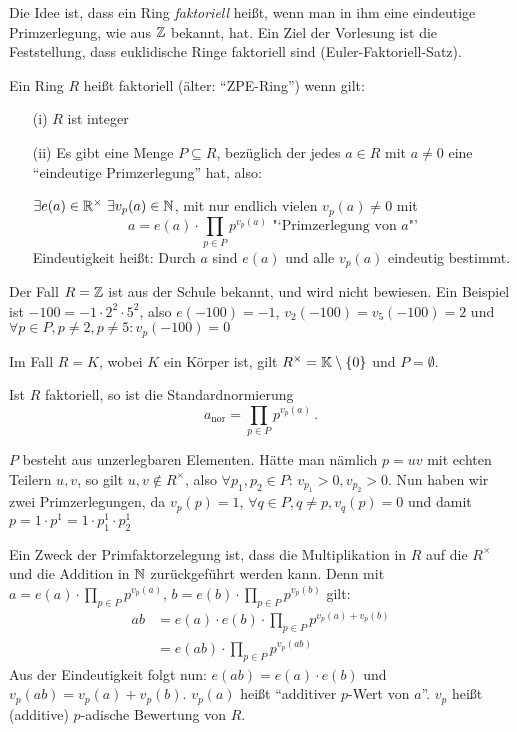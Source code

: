 \documentclass[a4paper,twoside,DIV15,BCOR12mm]{scrbook}
\begin{document}
Die Idee ist, dass ein Ring \emph{faktoriell} heißt, wenn man in ihm
eine eindeutige Primzerlegung, wie aus $\mathbb{Z}$ bekannt, hat. Ein Ziel
der Vorlesung ist die Feststellung, dass euklidische Ringe
faktoriell sind (Euler-Faktoriell-Satz).

\begin{definition}
Ein Ring $R$ heißt faktoriell (älter: "`ZPE-Ring"') wenn gilt:
\begin{itemize}
\item[(i)] $R$ ist integer
\item[(ii)] Es gibt eine Menge $P\subseteq R$, bezüglich der jedes $a\in R$ mit $a\ne 0$ eine "`eindeutige Primzerlegung"' hat, also:

$\exists e(a)\in\mathbb{R}^\times \ \exists v_p(a) \in \mathbb{N}$, mit nur
endlich vielen $v_p(a)\ne 0$ mit
\[a = e(a) \cdot \prod_{p\in P} p^{v_p(a)} \text{ "`Primzerlegung von $a$"'}\]
Eindeutigkeit heißt: Durch $a$ sind $e(a)$ und alle $v_p(a)$
eindeutig bestimmt.
\end{itemize}
\end{definition}

Der Fall $R=\mathbb{Z}$ ist aus der Schule bekannt, und wird nicht
bewiesen. Ein Beispiel ist $-100 = -1 \cdot 2^2 \cdot 5^2$, also
$e(-100)=-1$, $v_2(-100)=v_5(-100)=2$ und $\forall p\in P, p\ne 2,
p\ne5: v_p(-100)=0$

Im Fall $R=K$, wobei $K$ ein Körper ist, gilt
$R^\times=\mathbb{K}\setminus\{0\}$ und $ P=\emptyset$.

Ist $R$ faktoriell, so ist die Standardnormierung \[a_\text{nor} =
\prod_{p\in P} p^{v_p(a)}\,.\]

\begin{bemerkung}
$P$ besteht aus unzerlegbaren Elementen. Hätte man nämlich $p=uv$
mit echten Teilern $u,v$, so gilt $u,v\notin R^\times$, also
$\forall p_1,p_2 \in P$: $v_{p_1}>0,v_{p_2}>0$. Nun haben wir zwei
Primzerlegungen, da $v_p(p) = 1$, $\forall q\in P, q\ne p, v_q(p)=0$
und damit $p=1 \cdot p^1 = 1\cdot p_1^1 \cdot p_2^1$
\end{bemerkung}

Ein Zweck der Primfaktorzelegung ist, dass die Multiplikation in $R$
auf die $R^\times$ und die Addition in $\mathbb{N}$ zurückgeführt werden
kann. Denn mit $a=e(a) \cdot \prod_{p\in P} p^{v_p(a)}$, $b=e(b)
\cdot \prod_{p\in P} p^{v_p(b)}$ gilt:
\begin{align*}
ab &= e(a) \cdot e(b) \cdot \prod_{p\in P} p^{v_p(a) + v_p(b)} \\
   &= e(ab)\cdot \prod_{p\in P} p^{v_p(ab)}
\end{align*}
Aus der Eindeutigkeit folgt nun: $e(ab) = e(a) \cdot e(b)$ und
$v_p(ab) = v_p(a)+ v_p(b)$. $v_p(a)$ heißt "`additiver $p$-Wert
von $a$"'. $v_p$ heißt (additive) $p$-adische Bewertung von $R$.
\end{document}
